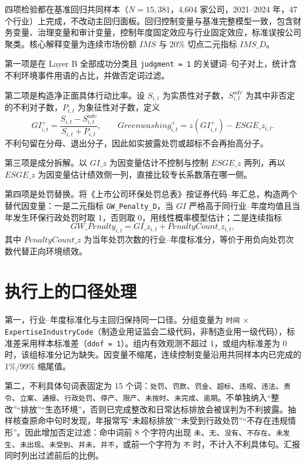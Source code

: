 \documentclass[12pt,a4paper]{article}
\begin{document}
四项检验都在基准回归共同样本（$N=15{,}381$，4,604 家公司，2021--2024 年，47 个行业）上完成，不改动主回归面板。回归控制变量与基准完整模型一致，包含财务变量、治理变量和审计变量，控制年度固定效应与行业固定效应，标准误按公司聚类。核心解释变量为连续市场份额 $IMS$ 与 20\% 切点二元指标 $IMS\_D$。

第一项是在 Layer B 全部成功分类且 \texttt{judgment = 1} 的关键词--句子对上，统计含不利环境事件用语的占比，并做否定词过滤。

第二项是构造净正面具体行动比率。设 $S_{i,t}$ 为实质性对子数，$S^{adv}_{i,t}$ 为其中非否定的不利对子数，$P_{i,t}$ 为象征性对子数，定义
\begin{equation}
GI^+_{i,t}=\frac{S_{i,t}-S^{adv}_{i,t}}{S_{i,t}+P_{i,t}},
\qquad
Greenwashing^+_{i,t}=z(GI^+_{i,t})-ESGE\_z_{i,t}.
\end{equation}
不利句留在分母、退出分子，因此如实披露处罚或超标不会再抬高分子。

第三项是成分拆解。以 $GI\_z$ 为因变量估计不控制与控制 $ESGE\_z$ 两列，再以 $ESGE\_z$ 为因变量估计绩效侧一列，直接比较专长系数落在哪一侧。

第四项是处罚替换。将《上市公司环保处罚总表》按证券代码--年汇总，构造两个替代因变量：一是二元指标 \texttt{GW\_Penalty\_D}，当 $GI$ 严格高于同行业--年度均值且当年发生环保行政处罚时取 1，否则取 0，用线性概率模型估计；二是连续指标
\begin{equation}
GW\_Penalty_{i,t}=GI\_z_{i,t}+PenaltyCount\_z_{i,t},
\end{equation}
其中 $PenaltyCount\_z$ 为当年处罚次数的行业--年度标准分，等价于用负向处罚次数代替正向环境绩效。

\section{执行上的口径处理}

第一，行业--年度标准化与主回归保持同一口径。分组变量为 \texttt{时间} $\times$ \texttt{ExpertiseIndustryCode}（制造业用证监会二级代码，非制造业用一级代码），标准差采用样本标准差（\texttt{ddof = 1}）。组内有效观测不超过 1，或组内标准差为 0 时，该组标准分记为缺失。因变量不缩尾，连续控制变量沿用共同样本内已完成的 1\%/99\% 缩尾值。

第二，不利具体句词表固定为 15 个词：\texttt{处罚}、\texttt{罚款}、\texttt{罚金}、\texttt{超标}、\texttt{违规}、\texttt{违法}、\texttt{责令}、\texttt{立案}、\texttt{通报}、\texttt{行政处罚}、\texttt{停产}、\texttt{限产}、\texttt{未按时}、\texttt{未完成}、\texttt{逾期}。不单独纳入``整改''``排放''``生态环境''，否则已完成整改和日常达标排放会被误判为不利披露。抽样核查原命中句时发现，年报常写``未超标排放''``未受到行政处罚''``不存在违规情形''。因此增加否定过滤：命中词前 8 个字符内出现 \texttt{未}、\texttt{无}、\texttt{没有}、\texttt{不存在}、\texttt{未发生}、\texttt{未出现}、\texttt{未受到}、\texttt{并未}、\texttt{并不}，或前一个字符为 \texttt{不} 时，不计入不利具体句。汇报同时列出过滤前后的比例。
\end{document}
